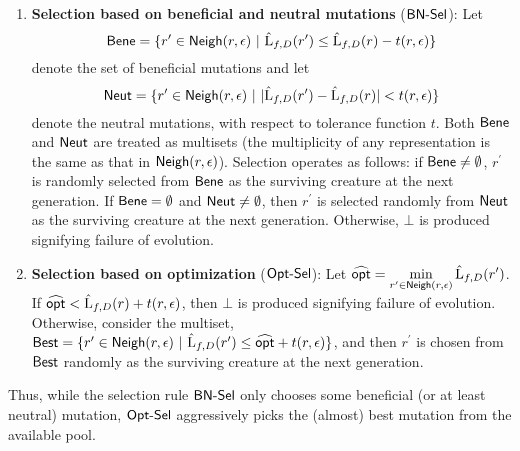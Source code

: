 \begin{enumerate}
\item {\bf Selection based on beneficial and neutral mutations} ($\mathsf{BN\mbox{-}Sel}$): Let 
%
\[ \mathsf{Bene} = \{r^\prime \in \mathsf{Neigh}(r, \epsilon) ~|~ \hat{\mathrm{L}}_{f, D}(r^\prime) \leq
\hat{\mathrm{L}}_{f, D}(r) - t(r, \epsilon) \} \]  
%
denote the set of beneficial mutations and let 
%
\[ \mathsf{Neut} = \{r^\prime \in \mathsf{Neigh}(r, \epsilon) ~|~ |\hat{\mathrm{L}}_{f, D}(r^\prime) -
\hat{\mathrm{L}}_{f, D}(r)| <  t(r, \epsilon) \} \]
%
denote the neutral mutations, with respect to tolerance function $t$. Both
$\mathsf{Bene}$ and $\mathsf{Neut}$ are treated as multisets (the multiplicity of any
representation is the same as that in $\mathsf{Neigh}(r, \epsilon)$). Selection
operates as follows: if $\mathsf{Bene} \neq \emptyset$, $r^\prime$ is randomly selected
from $\mathsf{Bene}$ as the surviving creature at the next generation.  If $\mathsf{Bene} =
\emptyset$ and $\mathsf{Neut} \neq\emptyset$, then $r^\prime$ is selected randomly from
$\mathsf{Neut}$ as the surviving creature at the next generation.  Otherwise, $\bot$ is
produced signifying failure of evolution.
%
\item {\bf Selection based on optimization} ($\mathsf{Opt\mbox{-}Sel}$): Let $\widehat{\mathsf{opt}} =
\displaystyle\min_{r^\prime \in \mathsf{Neigh}(r, \epsilon)} \hat{\mathrm{L}}_{f,
D}(r^\prime)$.  If $\widehat{\mathsf{opt}} < \hat{\mathrm{L}}_{f, D}(r) + t(r, \epsilon)$,
then $\bot$ is produced signifying failure of evolution.  Otherwise, consider
the multiset, $\mathsf{Best} = \{ r^\prime \in \mathsf{Neigh}(r, \epsilon) ~|~ \hat{\mathrm{L}}_{f,
D}(r^\prime) \leq \widehat{\mathsf{opt}} + t(r, \epsilon) \}$, and then $r^\prime$ is
chosen from $\mathsf{Best}$ randomly as the surviving creature at the next generation.
\end{enumerate}

\noindent Thus, while the selection rule $\mathsf{BN\mbox{-}Sel}$ only chooses some beneficial
(or at least neutral) mutation, $\mathsf{Opt\mbox{-}Sel}$ aggressively picks the (almost) best
mutation from the available pool. \medskip

